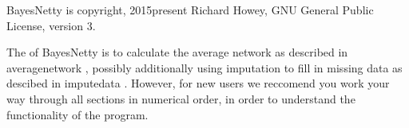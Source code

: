 \documentclass[letterpaper,10pt,english]{sphinxmanual}
\begin{document}
\sphinxAtStartPar
BayesNetty is copyright, 2015\sphinxhyphen{}present Richard Howey, GNU General Public License, version 3.

\begin{DUlineblock}{0em}
\item[] 
\item[] 
\end{DUlineblock}

\sphinxAtStartPar
The  of BayesNetty is to calculate the average network as described in  average\sphinxhyphen{}network ,
possibly additionally using imputation to fill in missing data as descibed in  impute\sphinxhyphen{}data .
However, for new users we reccomend you work your way through all sections in numerical order,
in order to understand the functionality of the program.



\renewcommand{\indexname}{Index}
\printindex
\end{document}

